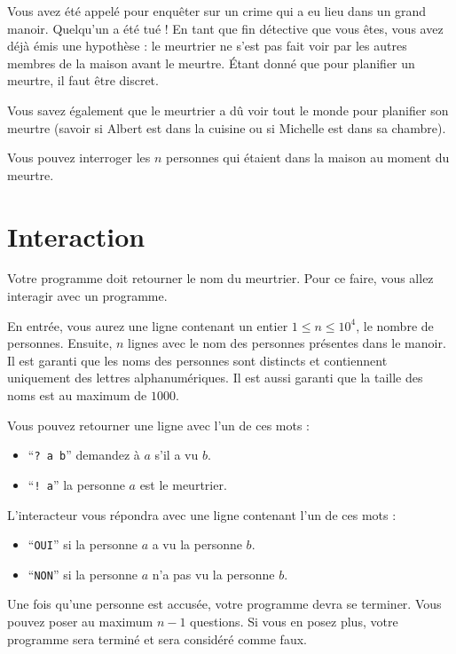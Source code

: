 \problemname{\problemyamlname}


\newcommand{\maxn}{10^4}  %

Vous avez été appelé pour enquêter sur un crime qui a eu lieu dans un grand manoir. Quelqu'un a été tué ! En tant que fin détective que vous êtes, vous avez déjà émis une hypothèse : le meurtrier ne s'est pas fait voir par les autres membres de la maison avant le meurtre. Étant donné que pour planifier un meurtre, il faut être discret.

Vous savez également que le meurtrier a dû voir tout le monde pour planifier son meurtre (savoir si Albert est dans la cuisine ou si Michelle est dans sa chambre).

Vous pouvez interroger les $n$ personnes qui étaient dans la maison au moment du meurtre.

\section*{Interaction}
Votre programme doit retourner le nom du meurtrier. Pour ce faire, vous allez interagir avec un programme.

En entrée, vous aurez une ligne contenant un entier $1 \le n \le \maxn$, le nombre de personnes.
Ensuite, $n$ lignes avec le nom des personnes présentes dans le manoir. Il est garanti que les noms des personnes sont distincts et contiennent uniquement des lettres alphanumériques. Il est aussi garanti que la taille des noms est au maximum de $1000$.

Vous pouvez retourner une ligne avec l'un de ces mots :

\begin{itemize}
    \item ``\texttt{? a b}'' demandez à $a$ s'il a vu $b$.
    \item ``\texttt{! a}'' la personne $a$ est le meurtrier.
\end{itemize}

L'interacteur vous répondra avec une ligne contenant l'un de ces mots :

\begin{itemize}
    \item ``\texttt{OUI}'' si la personne $a$ a vu la personne $b$.
    \item ``\texttt{NON}'' si la personne $a$ n'a pas vu la personne $b$.
\end{itemize}

Une fois qu'une personne est accusée, votre programme devra se terminer.
Vous pouvez poser au maximum $n - 1$ questions. Si vous en posez plus, votre programme sera terminé et sera considéré comme faux.
